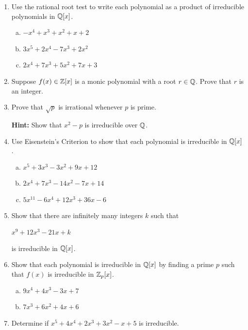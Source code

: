 \documentclass[11pt,fleqn,dvipsnames,usenames]{article}
\newcommand{\p}{\noindent}
\begin{document}
\p {\huge \S5.5 Problems}
\vsp
\begin{enumerate}[1.]
\item Use the rational root test to write each polynomial as a product of irreducible polynomials in $\mathbb{Q}[x]$.
\begin{enumerate}[(a)]
\item $-x^4 + x^3 + x^2 + x + 2$
\item $3x^5 + 2x^4 - 7x^3 + 2x^2$
\item $2x^4 + 7x^3 + 5x^2 + 7x + 3$
\end{enumerate}
\item Suppose $f(x)\in \mathbb{Z}[x]$ is a monic polynomial with a root $r\in \mathbb{Q}$.  Prove that $r$ is an integer.
\item Prove that $\sqrt{p}$ is irrational whenever $p$ is prime.

\textbf{Hint:} Show that $x^2 - p$ is irreducible over $\mathbb{Q}$.

\item Use Eisenstein's Criterion to show that each polynomial is irreducible in $\mathbb{Q}[x]$.
\begin{enumerate}[(a)]
\item $x^5 + 3x^3 - 3x^2 + 9x + 12$
\item $2x^4 + 7x^3 - 14x^2 - 7x + 14$
\item $5x^{11} - 6x^4 + 12x^3 + 36x - 6$
\end{enumerate}
\item Show that there are infinitely many integers $k$ such that
\begin{center}
$x^9 + 12x^3 - 21x + k$
\end{center}
is irreducible in $\mathbb{Q}[x]$.
\item Show that each polynomial is irreducible in $\mathbb{Q}[x]$ by finding a prime $p$ such that $f(x)$ is irreducible in $\mathbb{Z}_{p}[x]$.
\begin{enumerate}[(a)]
\item $9x^4 + 4x^3 - 3x + 7$
\item $7x^3 + 6x^2 + 4x + 6$
\end{enumerate}

\item Determine if $x^5 + 4x^4 + 2x^3 + 3x^2 - x + 5$ is irreducible.
\end{enumerate}
\end{document}
